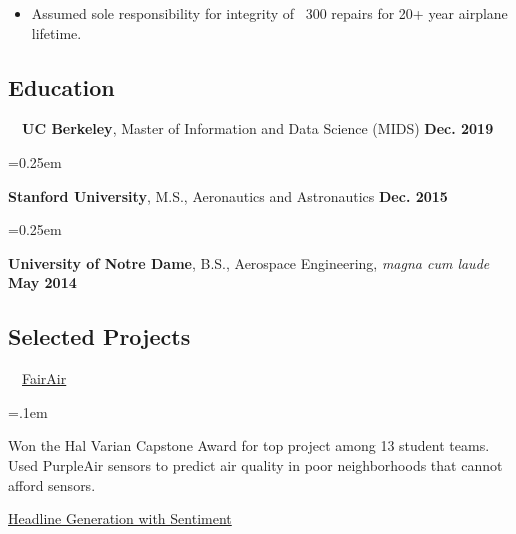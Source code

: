 \documentclass[10pt,letterpaper]{article}
\begin{document}
            \begin{itemize}[label={--}, leftmargin=.5in, labelindent=16pt, topsep=1pt]
            \setlength\itemsep{-.25em}
            	\item Assumed sole responsibility for integrity of ~300 repairs for 20+ year airplane lifetime.
            \end{itemize}

\begin{paracol}{2}
\setlength{\columnsep}{2em}

\begin{leftcolumn}

\subsection*{Education}

    \quad \ \ \textbf{UC Berkeley}, Master of Information and Data Science (MIDS) \textbf{\hfill Dec. 2019}

    \parskip=0.25em

    \textbf{Stanford University}, M.S., Aeronautics and Astronautics \textbf{\hfill Dec. 2015}

    \parskip=0.25em

    \textbf{University of Notre Dame}, B.S., Aerospace Engineering, \emph{magna cum laude} \textbf{\hfill May 2014}

\subsection*{Selected Projects}

    \quad \ \ \href{https://www.ischool.berkeley.edu/projects/2019/fairair-filling-gaps-air-pollution-monitoring}{FairAir}

    \parskip=.1em

        \begin{adjustwidth}{2.5em}{}
        Won the Hal Varian Capstone Award for top project among 13 student teams. Used PurpleAir sensors to predict air quality in poor neighborhoods that cannot afford sensors.
        \end{adjustwidth}

    \href{https://github.com/mpaluta/headline_generation/blob/master/Headline_Generation_Arnoldy_Paluta.pdf}{Headline Generation with Sentiment}


\end{leftcolumn}
\end{paracol}
\end{document}
